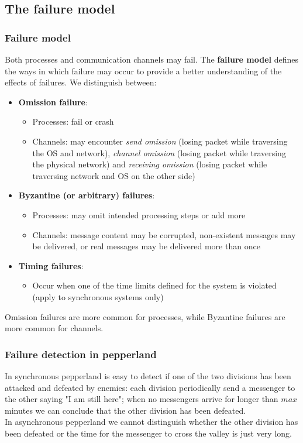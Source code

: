 \documentclass[10pt,a4paper]{article}
\begin{document}
\subsection{The failure model}
\subsubsection{Failure model}
Both processes and communication channels may fail. The \textbf{failure model} defines the ways in which failure may occur to provide a better understanding of the effects of failures. We distinguish between:
\begin{itemize}
	\item \textbf{Omission failure}: 
	\begin{itemize}
		\item Processes: fail or crash
		\item Channels: may encounter \textit{send omission} (losing packet while traversing the OS and network), \textit{channel omission} (losing packet while traversing the physical network) and \textit{receiving omission} (losing packet while traversing network and OS on the other side)
	\end{itemize}
	\item \textbf{Byzantine (or arbitrary) failures}:
	\begin{itemize}
		\item Processes: may omit intended processing steps or add more
		\item Channels: message content may be corrupted, non-existent messages may be delivered, or real messages may be delivered more than once
	\end{itemize}
	\item \textbf{Timing failures}:
	\begin{itemize}
		\item Occur when one of the time limits defined for the system is violated (apply to synchronous systems only)
		\end{itemize}
\end{itemize}
Omission failures are more common for processes, while Byzantine failures are more common for channels.
\subsubsection{Failure detection in pepperland}
In synchronous pepperland is easy to detect if one of the two divisions has been attacked and defeated by enemies:
each division periodically send a messenger to the other saying "I am still here"; when no messengers arrive for longer than $max$ minutes we can conclude that the other division has been defeated. \\
In asynchronous pepperland we cannot distinguish whether the other division has been defeated or the time for the messenger to cross the valley is just very long.
\end{document}
